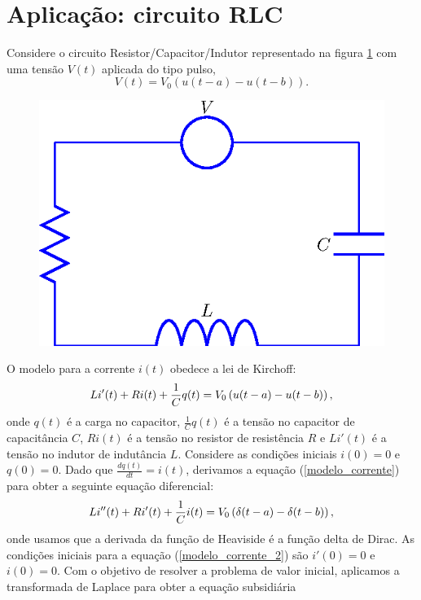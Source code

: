 \section{Aplicação: circuito RLC}{\label{sec_circ_2}}
Considere o circuito Resistor/Capacitor/Indutor representado na figura \ref{fig_circ_2} com uma tensão $V(t)$ aplicada do tipo pulso,
\begin{equation}
V(t)=V_0\left(u(t-a)-u(t-b)\right).
\end{equation}
\begin{figure}[!ht]
\begin{center}

\includegraphics{cap_dirac_conv/pics/figura_7}\end{center}
\caption{\label{fig_circ_2}}
\end{figure} 
O modelo para a corrente $i(t)$ obedece a lei de Kirchoff:
\begin{equation}{\label{modelo_corrente}}
Li'(t)+ Ri(t)+\frac{1}{C}q(t)=V_0\left(u(t-a)-u(t-b)\right),
\end{equation}
onde $q(t)$ é a carga no capacitor, $\frac{1}{C}q(t)$ é a tensão no capacitor de capacitância $C$, $Ri(t)$ é a tensão no resistor de resistência $R$ e $Li'(t)$ é a tensão no indutor de indutância $L$. Considere as condições iniciais $i(0)=0$ e $q(0)=0$.
Dado que $\frac{dq(t)}{dt}=i(t)$, derivamos a equação (\ref{modelo_corrente}) para obter a seguinte equação diferencial:
\begin{equation}{\label{modelo_corrente_2}}
Li''(t)+ Ri'(t)+\frac{1}{C}i(t)=V_0\left(\delta(t-a)-\delta(t-b)\right),
\end{equation}
onde usamos que a derivada da função de Heaviside é a função delta de Dirac. As condições iniciais para a equação (\ref{modelo_corrente_2}) são $i'(0)=0$ e $i(0)=0$. Com o objetivo de resolver a problema de valor inicial, aplicamos a transformada de Laplace para obter a equação subsidiária
